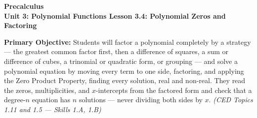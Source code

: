\documentclass[10pt]{article}
\newcommand{\CourseName}{Precalculus}
\newcommand{\UnitNumberName}{Unit 3: Polynomial Functions \quad}
\newcommand{\LessonNumberName}{Lesson 3.4: Polynomial Zeros and Factoring}
\begin{document}
\begin{center}
    {\Large\bfseries \CourseName \\
    {\small\bfseries \UnitNumberName \LessonNumberName}}
\end{center}

\begin{tcolorbox}[colback=lilac, colframe=plum, boxrule=0.9pt, arc=2mm,
    left=2mm, right=2mm, top=1.5mm, bottom=1.5mm]
    \textbf{Primary Objective:} Students will factor a polynomial completely by a strategy ---
    the greatest common factor first, then a difference of squares, a sum or difference of
    cubes, a trinomial or quadratic form, or grouping --- and solve a polynomial equation by
    moving every term to one side, factoring, and applying the Zero Product Property, finding
    every solution, real and non-real. They read the zeros, multiplicities, and $x$-intercepts
    from the factored form and check that a degree-$n$ equation has $n$ solutions --- never
    dividing both sides by $x$.
    \hfill\textit{\small (CED Topics 1.11 and 1.5 --- Skills 1.A, 1.B)}
\end{tcolorbox}
\end{document}
